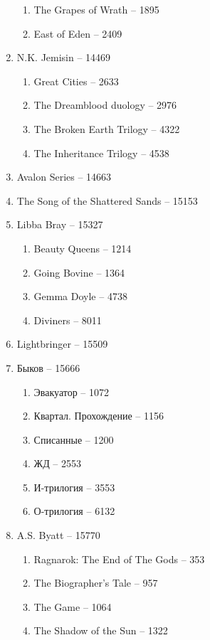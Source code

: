 \documentclass[a4paper, 11pt]{proc} %
\begin{document}
\begin{enumerate}
\begin{enumerate}
            \item The Grapes of Wrath -- 1895
            \item East of Eden -- 2409
        \end{enumerate}
    \item N.K. Jemisin -- 14469
        \begin{enumerate}
            \item Great Cities -- 2633
            \item The Dreamblood duology -- 2976
            \item The Broken Earth Trilogy -- 4322
            \item The Inheritance Trilogy -- 4538
        \end{enumerate}
    \item Avalon Series -- 14663
    \item The Song of the Shattered Sands -- 15153
    \item Libba Bray -- 15327
        \begin{enumerate}
            \item Beauty Queens -- 1214
            \item Going Bovine -- 1364
            \item Gemma Doyle -- 4738
            \item Diviners -- 8011
        \end{enumerate}
    \item Lightbringer -- 15509
    \item Быков -- 15666
        \begin{enumerate}
            \item Эвакуатор -- 1072
            \item Квартал. Прохождение -- 1156
            \item Списанные -- 1200
            \item ЖД -- 2553
            \item И-трилогия -- 3553
            \item О-трилогия -- 6132
        \end{enumerate}
    \item A.S. Byatt -- 15770
        \begin{enumerate}
            \item Ragnarok: The End of The Gods -- 353
            \item The Biographer's Tale -- 957
            \item The Game -- 1064
            \item The Shadow of the Sun -- 1322

\end{enumerate}
\end{enumerate}
\end{document}
